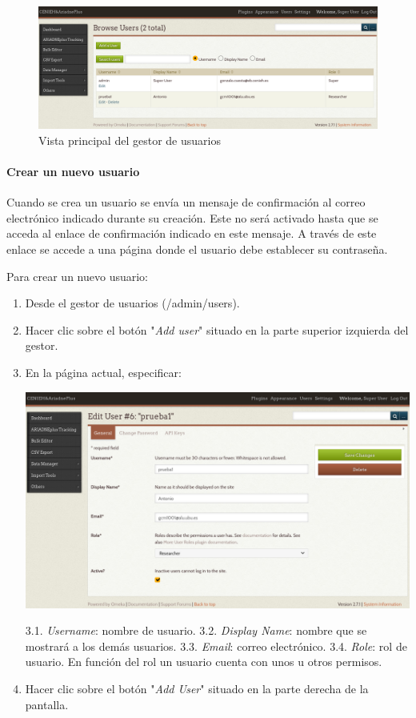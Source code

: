 \documentclass[
]{article}
\begin{document}
\begin{figure}
\hypertarget{users}{%
\centering
\includegraphics{../_static/images/users.png}
\caption{Vista principal del gestor de usuarios}\label{users}
}
\end{figure}

\hypertarget{crear-un-nuevo-usuario}{%
\paragraph{Crear un nuevo usuario}\label{crear-un-nuevo-usuario}}

Cuando se crea un usuario se envía un mensaje de confirmación al correo
electrónico indicado durante su creación. Este no será activado hasta
que se acceda al enlace de confirmación indicado en este mensaje. A
través de este enlace se accede a una página donde el usuario debe
establecer su contraseña.

Para crear un nuevo usuario:

\begin{enumerate}
\def\labelenumi{\arabic{enumi}.}
\item
  Desde el gestor de usuarios ({/admin/users}).
\item
  Hacer clic sobre el botón "\emph{Add user}" situado en la parte
  superior izquierda del gestor.
\item
  En la página actual, especificar:

  \includegraphics{../_static/images/new-user.png}

  3.1. \emph{Username}: nombre de usuario. 3.2. \emph{Display Name}:
  nombre que se mostrará a los demás usuarios. 3.3. \emph{Email}: correo
  electrónico. 3.4. \emph{Role}: rol de usuario. En función del rol un
  usuario cuenta con unos u otros permisos.
\item
  Hacer clic sobre el botón "\emph{Add User}" situado en la parte
  derecha de la pantalla.
\end{enumerate}
\end{document}
